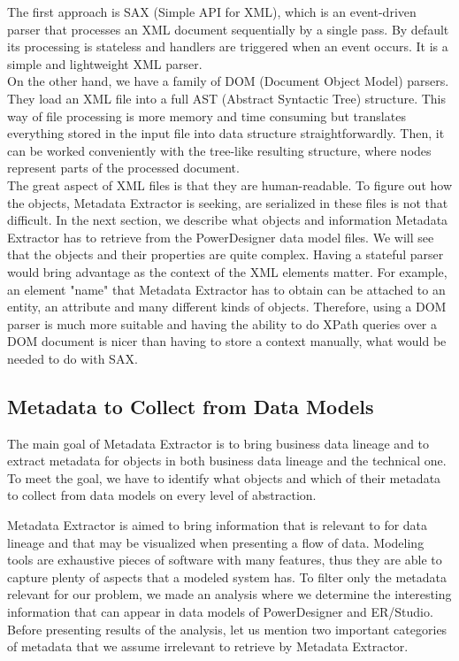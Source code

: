 The first approach is SAX (Simple API for XML), which is an event-driven parser that processes an XML document sequentially by a single pass. 
By default its processing is stateless and handlers are triggered when an event occurs. 
It is a simple and lightweight XML parser. \\

On the other hand, we have a family of DOM (Document Object Model) parsers. 
They load an XML file into a full AST (Abstract Syntactic Tree) structure. 
This way of file processing is more memory and time consuming but translates everything stored in the input file into data structure straightforwardly. 
Then, it can be worked conveniently with the tree-like resulting structure, where nodes represent parts of the processed document. \\

The great aspect of XML files is that they are human-readable. To figure out how the objects, Metadata Extractor is seeking, are serialized in these files is not that difficult.
In the next section, we describe what objects and information Metadata Extractor has to retrieve from the PowerDesigner data model files. We will see that the objects and their properties are quite complex.
Having a stateful parser would bring advantage as the context of the XML elements matter. For example, an element "name" that Metadata Extractor has to obtain can be attached to an entity, an attribute and many different kinds of objects.
Therefore, using a DOM parser is much more suitable and having the ability to do XPath queries over a DOM document is nicer than having to store a context manually, what would be needed to do with SAX.

\subsection{Metadata to Collect from Data Models}
\label{metadata_enumeration}

The main goal of Metadata Extractor is to bring business data lineage and to extract metadata for objects in both business data lineage and the technical one.
To meet the goal, we have to identify what objects and which of their metadata to collect from data models on every level of abstraction.

Metadata Extractor is aimed to bring information that is relevant to for data lineage and that may be visualized when presenting a flow of data.
Modeling tools are exhaustive pieces of software with many features, thus they are able to capture plenty of aspects that a modeled system has.
To filter only the metadata relevant for our problem, we made an analysis where we determine the interesting information that can appear in data models of PowerDesigner and ER/Studio. Before presenting results of the analysis, let us mention two important categories of metadata that we assume irrelevant to retrieve by Metadata Extractor.

